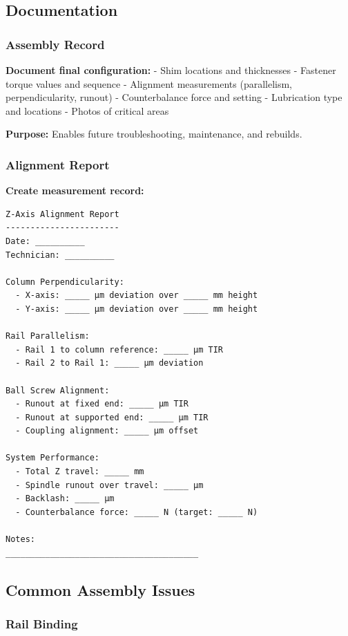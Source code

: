 \documentclass[
]{article}
\begin{document}
\subsection{Documentation}\label{documentation}

\subsubsection{Assembly Record}\label{assembly-record}

\textbf{Document final configuration:} - Shim locations and thicknesses
- Fastener torque values and sequence - Alignment measurements
(parallelism, perpendicularity, runout) - Counterbalance force and
setting - Lubrication type and locations - Photos of critical areas

\textbf{Purpose:} Enables future troubleshooting, maintenance, and
rebuilds.

\subsubsection{Alignment Report}\label{alignment-report}

\textbf{Create measurement record:}

\begin{verbatim}
Z-Axis Alignment Report
-----------------------
Date: __________
Technician: __________

Column Perpendicularity:
  - X-axis: _____ µm deviation over _____ mm height
  - Y-axis: _____ µm deviation over _____ mm height

Rail Parallelism:
  - Rail 1 to column reference: _____ µm TIR
  - Rail 2 to Rail 1: _____ µm deviation

Ball Screw Alignment:
  - Runout at fixed end: _____ µm TIR
  - Runout at supported end: _____ µm TIR
  - Coupling alignment: _____ µm offset

System Performance:
  - Total Z travel: _____ mm
  - Spindle runout over travel: _____ µm
  - Backlash: _____ µm
  - Counterbalance force: _____ N (target: _____ N)

Notes:
_______________________________________
\end{verbatim}

\subsection{Common Assembly Issues}\label{common-assembly-issues}

\subsubsection{Rail Binding}\label{rail-binding}
\end{document}
